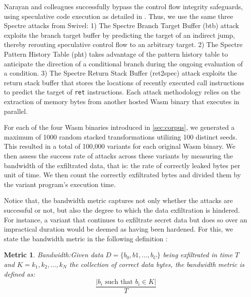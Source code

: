 \documentclass[sigplan,screen]{acmart}
\newcommand*\badge[1]{ \colorbox{red}{\color{white}#1}}
\newcommand{\tool}{Wasm-mutate\xspace}
\newcommand{\wasm}{Wasm\xspace}
\newtheorem{metric}{Metric}
\newcommand{\todo}[1]{%
\refstepcounter{todo}
\noindent\textbf{\badge{TODO}} {\color{red}#1}
\addcontentsline{td}{todo}
{\color{red}\thesection.\thetodo\xspace #1}}
\begin{document}

Narayan and colleagues successfully bypass the control flow integrity safeguards, using speculative code execution as detailed in \cite{Spectre}. 
Thus, we use the same three Spectre attacks from Swivel:
1) The Spectre Branch Target Buffer (btb) attack exploits the branch target buffer by predicting the target of an indirect jump, thereby rerouting speculative control flow to an arbitrary target.
2) The Spectre Pattern History Table (pht) takes advantage of the pattern history table to anticipate the direction of a conditional branch during the ongoing evaluation of a condition. 
3) The Spectre Return Stack Buffer (ret2spec) attack exploits the return stack buffer that stores the locations of recently executed call instructions to predict the target of \texttt{ret} instructions. 
Each attack methodology relies on the extraction of memory bytes from another hosted \wasm binary that executes in parallel.


For each of the four \wasm binaries introduced in \autoref{sec:corpus}, we generated a maximum of 1000 random stacked transformations utilizing 100 distinct seeds. 
This resulted in a total of 100,000 variants for each original \wasm binary.
We then assess the success rate of attacks across these variants by measuring the bandwidth of the exfiltrated data, that is: the rate of correctly leaked bytes per unit of time. 
We then count the correctly exfiltrated bytes and divided them by the variant program's execution time. 

Notice that, the bandwidth metric captures not only whether the attacks are successful or not, but also the degree to which the data exfiltration is hindered.
For instance, a variant that continues to exfiltrate secret data but does so over an impractical duration would be deemed as having been hardened. 
For this, we state the bandwidth metric in the following definition :

\begin{metric}{Bandwidth:}\label{metric:ber}
Given data $D=\{b_0, b1, ..., b_C\}$ being exfiltrated in time $T$ and $K = {k_1, k_2, ..., k_N}$ the collection of correct data bytes, the bandwidth metric is defined as:
$$
    \frac{|b_i\text{ such that } b_i \in K|}{T}
$$
\end{metric}
\end{document}
